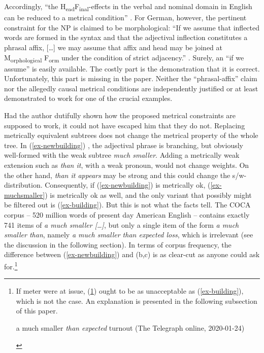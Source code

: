 \documentclass[output=paper
  ,nobabel
  ,uniformtopskip %
]{langscibook}
\begin{document}
Accordingly, ``the H\textsubscript{ead}F\textsubscript{inal}-effects in the verbal and nominal domain in English can be reduced to a metrical condition'' \citep[180]{Hinterhoelzl2016}. For German, however, the pertinent constraint for the NP is claimed to be morphological: ``If we assume that inflected words are formed in the syntax and that the adjectival inflection constitutes a phrasal affix, [\ldots] we may assume that affix and head may be joined at M\textsubscript{orphological} F\textsubscript{orm} under the condition of strict adjacency.'' \citep[188]{Hinterhoelzl2016}. Surely, an ``if we assume'' is easily available. The costly part is the demonstration that it is correct.
Unfortunately, this part is missing in the paper. Neither the ``phrasal-affix'' claim nor the allegedly causal metrical conditions are independently justified or at least demonstrated to work for one of the crucial examples.

\largerpage
Had the author dutifully shown how the proposed metrical constraints are supposed to work, it could not have escaped him that they do not. Replacing metrically equivalent subtrees does not change the metrical property of the whole tree. In (\ref{ex-newbuilding}) , the adjectival phrase is branching, but obviously well-formed with the weak subtree \emph{much smaller}. Adding a metrically weak extension such as \emph{than it}, with a weak pronoun, would not change weights. On the other hand, \emph{than it appears} may be strong and this could change the s/w-distribution. Consequently, if (\ref{ex-newbuilding}) is metrically ok, (\ref{ex-muchsmaller}) is metrically ok as well, and the only variant that possibly might be filtered out is (\ref{ex-building}). But this is not what the facts tell. The COCA corpus – 520 million words of present day American English –  contains exactly 741 items of \emph{a much smaller [\ldots]}, but only a single item of the form \emph{a much smaller than}, namely \emph{a much smaller than expected loss}, which is irrelevant (see the discussion in the following section). In terms of corpus frequency, the difference between (\ref{ex-newbuilding})  and (b,c)  is as clear-cut as anyone could ask for.\footnote{%
If meter were at issue, (\ref{ex-turnout}) ought to be as unacceptable as (\ref{ex-building}), which is not the case. An explanation is presented in the following subsection of this paper.

\begin{exe}
\ex\label{ex-turnout}
a much smaller \emph{than expected} turnout \hfill (The Telegraph online, 2020-01-24)
\end{exe}
}
\eal
{}\label{ex-newbuilding}
\end{document}
